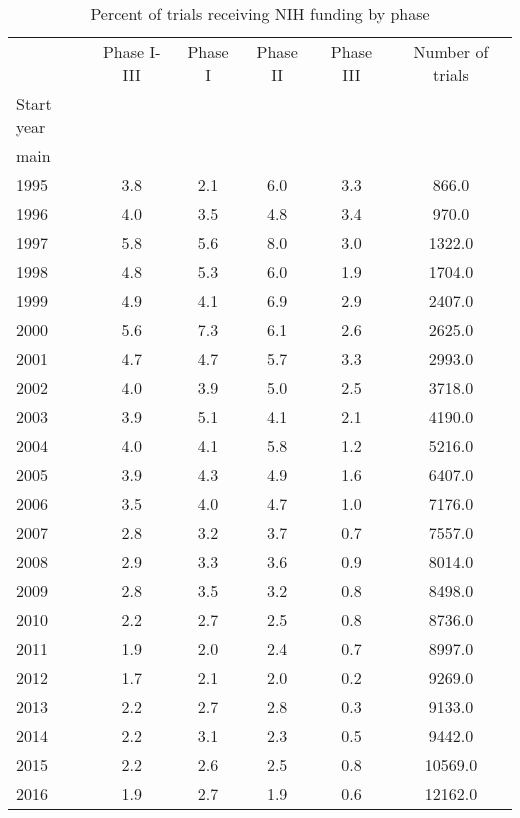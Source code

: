 \begin{table}[htbp]\centering
\caption{Percent of trials receiving NIH funding by phase}
\begin{tabular}{l*{5}{c}}
\hline\hline
          &\multicolumn{1}{c}{Phase I-III}&\multicolumn{1}{c}{Phase I}&\multicolumn{1}{c}{Phase II}&\multicolumn{1}{c}{Phase III}&\multicolumn{1}{c}{Number of trials}\\
Start year&         &         &         &         &         \\
\hline
main      &         &         &         &         &         \\
1995      &      3.8&      2.1&      6.0&      3.3&    866.0\\
1996      &      4.0&      3.5&      4.8&      3.4&    970.0\\
1997      &      5.8&      5.6&      8.0&      3.0&   1322.0\\
1998      &      4.8&      5.3&      6.0&      1.9&   1704.0\\
1999      &      4.9&      4.1&      6.9&      2.9&   2407.0\\
2000      &      5.6&      7.3&      6.1&      2.6&   2625.0\\
2001      &      4.7&      4.7&      5.7&      3.3&   2993.0\\
2002      &      4.0&      3.9&      5.0&      2.5&   3718.0\\
2003      &      3.9&      5.1&      4.1&      2.1&   4190.0\\
2004      &      4.0&      4.1&      5.8&      1.2&   5216.0\\
2005      &      3.9&      4.3&      4.9&      1.6&   6407.0\\
2006      &      3.5&      4.0&      4.7&      1.0&   7176.0\\
2007      &      2.8&      3.2&      3.7&      0.7&   7557.0\\
2008      &      2.9&      3.3&      3.6&      0.9&   8014.0\\
2009      &      2.8&      3.5&      3.2&      0.8&   8498.0\\
2010      &      2.2&      2.7&      2.5&      0.8&   8736.0\\
2011      &      1.9&      2.0&      2.4&      0.7&   8997.0\\
2012      &      1.7&      2.1&      2.0&      0.2&   9269.0\\
2013      &      2.2&      2.7&      2.8&      0.3&   9133.0\\
2014      &      2.2&      3.1&      2.3&      0.5&   9442.0\\
2015      &      2.2&      2.6&      2.5&      0.8&  10569.0\\
2016      &      1.9&      2.7&      1.9&      0.6&  12162.0\\
\hline\hline
\end{tabular}
\end{table}
